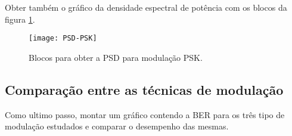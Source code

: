 Obter também o gráfico da densidade espectral de potência com os blocos da figura \ref{fig:PSD-PSK}.

\begin{figure}[H]
    \centering
    \texttt{[image: PSD-PSK]}
    \caption{Blocos para obter a PSD para modulação PSK.}
    \label{fig:PSD-PSK}
\end{figure}

\subsection{Comparação entre as técnicas de modulação}

Como ultimo passo, montar um gráfico contendo a BER para os três tipo de modulação estudados e comparar o desempenho das mesmas.
